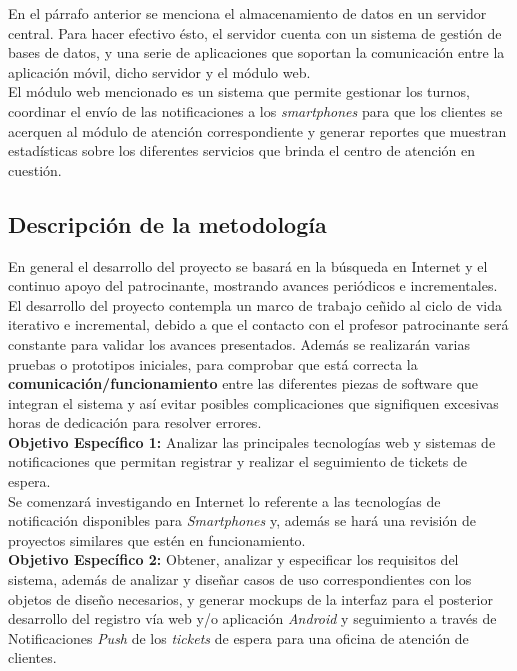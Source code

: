 En el párrafo anterior se menciona el almacenamiento de datos en un servidor central. Para hacer efectivo ésto, el servidor cuenta con un sistema de gestión de bases de datos, y una serie de aplicaciones que soportan la comunicación entre la aplicación móvil, dicho servidor y el módulo web.\\

El módulo web mencionado es un sistema que permite gestionar los turnos, coordinar el envío de las notificaciones a los \textit{smartphones} para que los clientes se acerquen al módulo de atención correspondiente y generar reportes que muestran estadísticas sobre los diferentes servicios que brinda el centro de atención en cuestión.\\

\subsection{Descripción de la metodología}

En general el desarrollo del proyecto se basará en la búsqueda en Internet y el continuo apoyo del patrocinante, mostrando avances periódicos e incrementales. El desarrollo del proyecto contempla un marco de trabajo ceñido al ciclo de vida iterativo e incremental, debido a que el contacto con el  profesor patrocinante será constante para validar los avances presentados. Además se realizarán varias pruebas o prototipos iniciales, para comprobar que está correcta la \textbf{comunicación/funcionamiento} entre las diferentes piezas de software que integran el sistema y así evitar posibles complicaciones que signifiquen excesivas horas de dedicación para resolver errores. \\

\textbf{Objetivo Específico 1:} Analizar las principales tecnologías web y sistemas de notificaciones que permitan registrar y realizar el seguimiento de tickets de espera.\\

Se comenzará investigando en Internet lo referente a las tecnologías de notificación disponibles para \textit{Smartphones} y, además se hará una revisión de proyectos similares que estén en funcionamiento. \\

\textbf{Objetivo Específico 2:} Obtener, analizar y especificar los requisitos del sistema, además de analizar y diseñar casos de uso correspondientes con los objetos de diseño necesarios, y generar mockups de la interfaz para el posterior desarrollo del registro vía web y/o aplicación \textit{Android} y seguimiento a través de Notificaciones \textit{Push} de los \textit{tickets} de espera para una oficina de atención de clientes.\\

